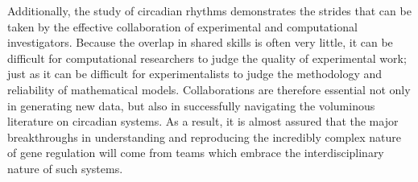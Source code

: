 Additionally, the study of circadian rhythms demonstrates the strides that can be taken by the effective collaboration of experimental and computational investigators.
Because the overlap in shared skills is often very little, it can be difficult for computational researchers to judge the quality of experimental work; just as it can be difficult for experimentalists to judge the methodology and reliability of mathematical models.
Collaborations are therefore essential not only in generating new data, but also in successfully navigating the voluminous literature on circadian systems.
As a result, it is almost assured that the major breakthroughs in understanding and reproducing the incredibly complex nature of gene regulation will come from teams which embrace the interdisciplinary nature of such systems.
